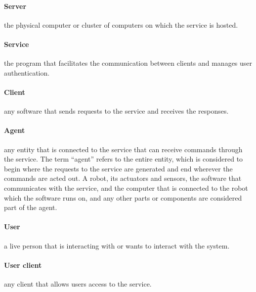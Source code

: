 \paragraph{Server} the physical computer or cluster of computers on which the service is hosted.

\paragraph{Service} the program that facilitates the communication between clients and manages user authentication.

\paragraph{Client} any software that sends requests to the service and receives the responses.

\paragraph{Agent} any entity that is connected to the service that can receive commands through the service.
The term ``agent'' refers to the entire entity, which is considered to begin where the requests to the service are generated and end wherever the commands are acted out.
A robot, its actuators and sensors, the software that communicates with the service, and the computer that is connected to the robot which the software runs on, and any other parts or components are considered part of the agent.

\paragraph{User} a live person that is interacting with or wants to interact with the system.

\paragraph{User client} any client that allows users access to the service.


